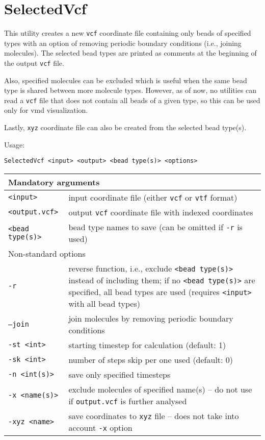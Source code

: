 \section{SelectedVcf} \label{sec:SelectedVcf}

This utility creates a new \texttt{vcf} coordinate file containing only
beads of specified types with an option of removing periodic boundary
conditions (i.e., joining molecules). The selected bead types are printed
as comments at the beginning of the output \texttt{vcf} file.

Also, specified molecules can be excluded which is useful when the same
bead type is shared between more molecule types. However, as of now, no
utilities can read a \texttt{vcf} file that does not contain all beads of a
given type, so this can be used only for vmd visualization.

Lastly, \texttt{xyz} coordinate file can also be created from the selected
bead type(s).

Usage:

\vspace{1em}
\noindent
\texttt{SelectedVcf <input> <output> <bead type(s)> <options>}

\vspace{1em}
\noindent
\begin{longtable}{p{}p{}}
  \toprule
  \multicolumn{2}{l}{Mandatory arguments} \\
  \midrule
  \texttt{<input>} & input coordinate file (either \texttt{vcf} or
    \texttt{vtf} format) \\
  \texttt{<output.vcf>} & output \texttt{vcf} coordinate file with indexed
    coordinates \\
  \texttt{<bead type(s)>} & bead type names to save (can be omitted if
    \texttt{-r} is used) \\
  \toprule
  \multicolumn{2}{l}{Non-standard options} \\
  \midrule
  \texttt{-r} & reverse function, i.e., exclude \texttt{<bead type(s)>}
    instead of including them; if no \texttt{<bead type(s)>} are specified,
    all bead types are used (requires \texttt{<input>} with all bead types) \\
  \texttt{--join} & join molecules by removing periodic boundary conditions \\
  \texttt{-st <int>} & starting timestep for calculation (default: 1) \\
  \texttt{-sk <int>} & number of steps skip per one used (default: 0) \\
  \texttt{-n <int(s)>} & save only specified timesteps \\
  \texttt{-x <name(s)>} & exclude molecules of specified name(s) -- do not
    use if \texttt{output.vcf} is further analysed \\
  \texttt{-xyz <name>} & save coordinates to \texttt{xyz} file -- does not
    take into account \texttt{-x} option \\
  \bottomrule
\end{longtable}
